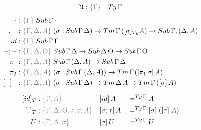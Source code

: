 \documentclass[a4paper,UKenglish,numberwithinsect,cleveref,thm-restate]{lipics-v2021}
\begin{document}
\begin{alignat*}{3}
  \UU & : \implicit{\Gamma} & \Ty\, \Gamma
\end{alignat*}
\begin{alignat*}{3}
  \emptysub & : \implicit{\Gamma}\;\Sub\,\Gamma\,\emptyctx \\
  \blank,\blank & : \implicit{\Gamma, \Delta, A}\;(\sigma : \Sub\,\Gamma\,\Delta) \to \Tm\,\Gamma\,([ \sigma ]_{\Ty} A) \to \Sub\,\Gamma,(\Delta, A) \\
  \idS & : \implicit{\Gamma}\;\Sub\,\Gamma\,\Gamma \\
  \blank;\blank & : \implicit{\Gamma, \Delta, \Theta}\;\Sub\,\Gamma\,\Delta \to \Sub\,\Delta\,\Theta \to \Sub\,\Gamma\,\Theta \\
  \pi_1 & : \implicit{\Gamma, \Delta, A}\;\Sub\,\Gamma\,(\Delta, A) \to \Sub\,\Gamma\,\Delta \\
  \pi_2 & : \implicit{\Gamma, \Delta, A}\;(\sigma : \Sub\,\Gamma\,(\Delta, A)) \to \Tm\,\Gamma\,([ \pi_1\,\sigma ]\, A) \\
  [\blank] \blank & : \implicit{\Gamma,\Delta, A}\;(\sigma : \Sub\,\Gamma\,\Delta) \to \Tm\,\Delta\,A \to \Tm\,\Gamma\,([\sigma]\, A)
\end{alignat*}


\begin{alignat*}{3}
  [\idS]_T & : \implicit{\Gamma, A}                               && [ \idS ] \,A         && =^{\Ty\,\Gamma} A \\
  [;]_T    & : \implicit{\Gamma, \Delta, \Theta, \sigma, \tau, A} && [ \sigma ; \tau ]\,A && =^{\Ty\,\Gamma} [ \sigma ]\;([ \tau ]\;A) \\
  []U      & : \implicit{\Gamma, \Delta, \sigma}                  && [ \sigma ]\,U        && =^{\Ty\,\Gamma} U
\end{alignat*}
\end{document}
